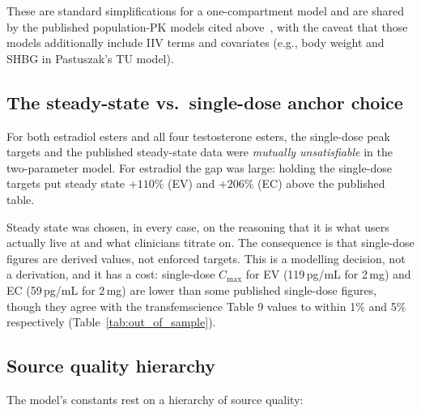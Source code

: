 \documentclass[11pt,a4paper]{article}
\begin{document}
These are standard simplifications for a one-compartment model and are
shared by the published population-PK models cited
above~\cite{bi2018,ichihara2020,pastuszak2021}, with the caveat that
those models additionally include IIV terms and covariates (e.g., body
weight and SHBG in Pastuszak's TU model).

\subsection{The steady-state vs.\ single-dose anchor choice}
\label{sec:anchor_choice}

For both estradiol esters and all four testosterone esters, the
single-dose peak targets and the published steady-state data were
\emph{mutually unsatisfiable} in the two-parameter model. For estradiol
the gap was large: holding the single-dose targets put steady state
$+110\%$ (EV) and $+206\%$ (EC) above the published table.

Steady state was chosen, in every case, on the reasoning that it is what
users actually live at and what clinicians titrate on. The consequence
is that single-dose figures are derived values, not enforced targets.
This is a modelling decision, not a derivation, and it has a cost:
single-dose $C_{\max}$ for EV (119\,pg/mL for 2\,mg) and EC (59\,pg/mL
for 2\,mg) are lower than some published single-dose figures, though
they agree with the transfemscience Table 9 values to within 1\% and
5\% respectively (Table~\ref{tab:out_of_sample}).

\subsection{Source quality hierarchy}
\label{sec:source_quality}

The model's constants rest on a hierarchy of source quality:
\end{document}
